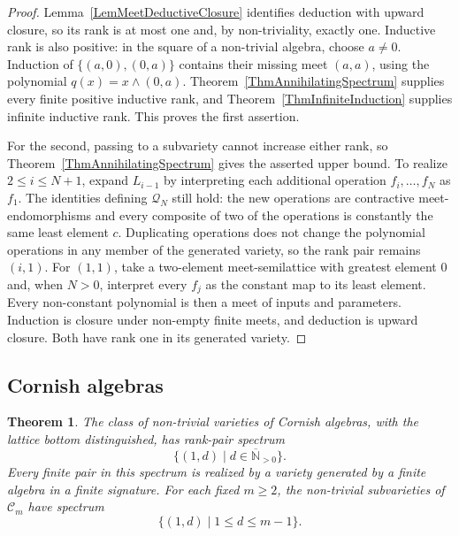 \documentclass[12pt,english]{amsart}
\newtheorem{theorem}{Theorem}[section]
\theoremstyle{definition}
\numberwithin{equation}{section}
\theoremstyle{remark}
\begin{document}
\begin{proof}
Lemma~\ref{LemMeetDeductiveClosure} identifies deduction with upward
closure, so its rank is at most one and, by non-triviality, exactly
one. Inductive rank is also positive: in the square of a non-trivial
algebra, choose $a\ne0$. Induction of $\{(a,0),(0,a)\}$ contains
their missing meet $(a,a)$, using the polynomial
$q(x)=x\wedge(0,a)$. Theorem~\ref{ThmAnnihilatingSpectrum} supplies
every finite positive inductive rank, and
Theorem~\ref{ThmInfiniteInduction} supplies infinite inductive rank.
This proves the first assertion.

For the second, passing to a subvariety cannot increase either rank,
so Theorem~\ref{ThmAnnihilatingSpectrum} gives the asserted upper
bound. To realize $2\leqslant i\leqslant N+1$, expand $L_{i-1}$ by
interpreting each additional operation $f_i,\ldots,f_N$ as $f_1$.
The identities defining $\mathcal Q_N$ still hold: the new operations
are contractive meet-endomorphisms and every composite of two of the
operations is constantly the same least element $c$. Duplicating
operations does not change the polynomial operations in any member
of the generated variety, so the rank pair remains $(i,1)$.
For $(1,1)$, take a two-element meet-semilattice with greatest element
$0$ and, when $N>0$, interpret every $f_j$ as the constant map to its
least element. Every non-constant polynomial is then a meet of inputs
and parameters. Induction is closure under non-empty finite meets,
and deduction is upward closure. Both have rank one in its generated
variety.
\end{proof}

\subsection{Cornish algebras}

\begin{theorem}\label{ThmSpecialCornishSpectrum}
The class of non-trivial varieties of Cornish algebras, with the lattice
bottom distinguished, has rank-pair spectrum
\[
\{(1,d)\mid d\in\overline{\mathbb N}_{>0}\}.
\]
Every finite pair in this spectrum is realized by a variety generated
by a finite algebra in a finite signature.
For each fixed $m\geqslant2$, the non-trivial subvarieties of
$\mathcal C_m$ have spectrum
\[
\{(1,d)\mid 1\leqslant d\leqslant m-1\}.
\]
\end{theorem}
\end{document}
